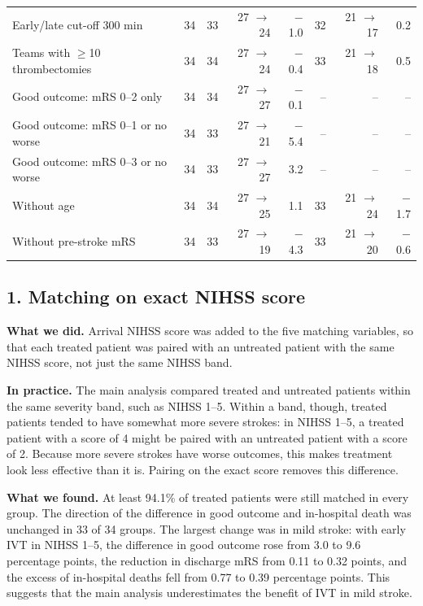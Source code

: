 \begin{table}[H]
\begin{tabular}{lrrrrrrr}
Early/late cut-off 300 min & 34 & 33 & 27 $\rightarrow$ 24 & $-$1.0 & 32 & 21 $\rightarrow$ 17 & 0.2 \\
Teams with $\ge$10 thrombectomies & 34 & 34 & 27 $\rightarrow$ 24 & $-$0.4 & 33 & 21 $\rightarrow$ 18 & 0.5 \\
Good outcome: mRS 0--2 only & 34 & 34 & 27 $\rightarrow$ 27 & $-$0.1 & -- & -- & -- \\
Good outcome: mRS 0--1 or no worse & 34 & 33 & 27 $\rightarrow$ 21 & $-$5.4 & -- & -- & -- \\
Good outcome: mRS 0--3 or no worse & 34 & 33 & 27 $\rightarrow$ 27 & 3.2 & -- & -- & -- \\
Without age & 34 & 34 & 27 $\rightarrow$ 25 & 1.1 & 33 & 21 $\rightarrow$ 24 & $-$1.7 \\
Without pre-stroke mRS & 34 & 33 & 27 $\rightarrow$ 19 & $-$4.3 & 33 & 21 $\rightarrow$ 20 & $-$0.6 \\
\bottomrule
\end{tabular}
\end{table}

\subsection*{1. Matching on exact NIHSS score}

\textbf{What we did.} Arrival NIHSS score was added to the five matching variables, so that each treated patient was paired with an untreated patient with the same NIHSS score, not just the same NIHSS band.

\textbf{In practice.} The main analysis compared treated and untreated patients within the same severity band, such as NIHSS 1--5. Within a band, though, treated patients tended to have somewhat more severe strokes: in NIHSS 1--5, a treated patient with a score of 4 might be paired with an untreated patient with a score of 2. Because more severe strokes have worse outcomes, this makes treatment look less effective than it is. Pairing on the exact score removes this difference.

\textbf{What we found.} At least 94.1\% of treated patients were still matched in every group. The direction of the difference in good outcome and in-hospital death was unchanged in 33 of 34 groups. The largest change was in mild stroke: with early IVT in NIHSS 1--5, the difference in good outcome rose from 3.0 to 9.6 percentage points, the reduction in discharge mRS from 0.11 to 0.32 points, and the excess of in-hospital deaths fell from 0.77 to 0.39 percentage points. This suggests that the main analysis underestimates the benefit of IVT in mild stroke.

